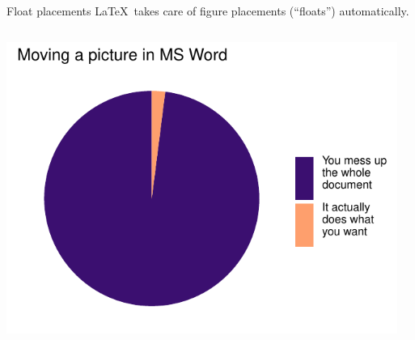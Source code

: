 \documentclass[,aspectratio=43]{beamer}
\begin{document}
\begin{frame}{Float placements}
\protect\hypertarget{float-placements}{}
\LaTeX~takes care of figure placements (``floats'') automatically.

\begin{columns}[T]
\begin{column}{0.64\textwidth}
\begin{center}\includegraphics[width=1\linewidth]{figure/piechart-1} \end{center}
\end{column}

\begin{column}{0.33\textwidth}
\vspace{2em}


\end{column}
\end{columns}
\end{frame}
\end{document}
